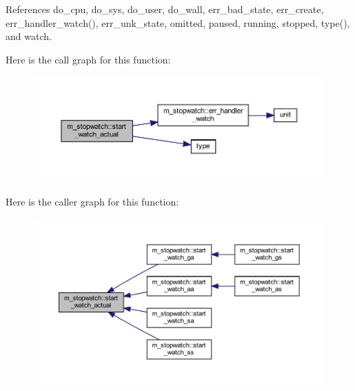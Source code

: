 References do\+\_\+cpu, do\+\_\+sys, do\+\_\+user, do\+\_\+wall, err\+\_\+bad\+\_\+state, err\+\_\+create, err\+\_\+handler\+\_\+watch(), err\+\_\+unk\+\_\+state, omitted, paused, running, stopped, type(), and watch.

Here is the call graph for this function\+:
\nopagebreak
\begin{figure}[H]
\begin{center}
\leavevmode
\includegraphics[width=350pt]{namespacem__stopwatch_a80ef48faa6df7821de6ef06c0fa650fe_cgraph}
\end{center}
\end{figure}
Here is the caller graph for this function\+:
\nopagebreak
\begin{figure}[H]
\begin{center}
\leavevmode
\includegraphics[width=350pt]{namespacem__stopwatch_a80ef48faa6df7821de6ef06c0fa650fe_icgraph}
\end{center}
\end{figure}
\mbox{\label{namespacem__stopwatch_a6068b7fef26a5ab12f7b92a765fe32ca}} 
